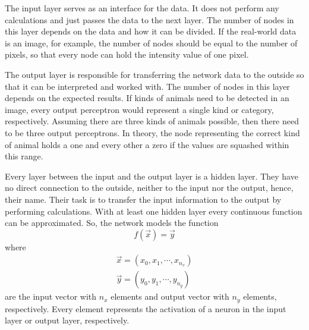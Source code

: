 The input layer serves as an interface for the data.
It does not perform any calculations and just passes the data to the next layer.
The number of nodes in this layer depends on the data and how it can be divided.
If the real-world data is an image, for example, the number of nodes should be equal to the number of pixels, so that every node can hold the intensity value of one pixel.

The output layer is responsible for transferring the network data to the outside so that it can be interpreted and worked with.
The number of nodes in this layer depends on the expected results.
If kinds of animals need to be detected in an image, every output perceptron would represent a single kind or category, respectively.
Assuming there are three kinds of animals possible, then there need to be three output perceptrons.
In theory, the node representing the correct kind of animal holds a one and every other a zero if the values are squashed within this range.

Every layer between the input and the output layer is a hidden layer.
They have no direct connection to the outside, neither to the input nor the output, hence, their name.
Their task is to transfer the input information to the output by performing calculations.
With at least one hidden layer every continuous function can be approximated.
So, the network models the function 
\begin{equation}
	\label{eq:multilayer-perceptron}
	f(\vec{x}) = \vec{y}
\end{equation}
where
\begin{align}
	\vec{x} = (x_0, x_1, \cdots, x_{n_x}) \\
	\vec{y} = (y_0, y_1, \cdots, y_{n_y})
\end{align}
are the input vector with $n_x$ elements and output vector with $n_y$ elements, respectively.
Every element represents the activation of a neuron in the input layer or output layer, respectively.

